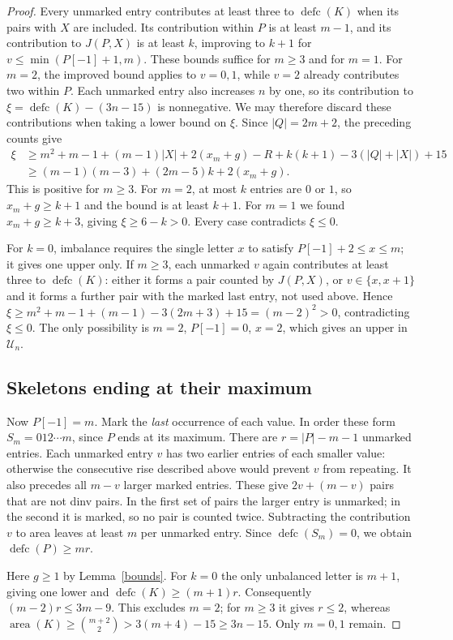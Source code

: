 \documentclass[11pt]{article}
\DeclareMathOperator{\area}{area}\DeclareMathOperator{\dinv}{dinv}
\DeclareMathOperator{\defc}{defc}\DeclareMathOperator{\sym}{sym}
\begin{document}
\begin{proof}
Every unmarked entry contributes at least three to $\defc(K)$ when its pairs with $X$ are included. Its contribution within $P$ is at least $m-1$, and its contribution to $J(P,X)$ is at least $k$, improving to $k+1$ for $v\le\min(P[-1]+1,m)$. These bounds suffice for $m\ge3$ and for $m=1$. For $m=2$, the improved bound applies to $v=0,1$, while $v=2$ already contributes two within $P$. Each unmarked entry also increases $n$ by one, so its contribution to $\xi=\defc(K)-(3n-15)$ is nonnegative. We may therefore discard these contributions when taking a lower bound on $\xi$. Since $|Q|=2m+2$, the preceding counts give
\begin{align*}
 \xi&\ge m^2+m-1+(m-1)|X|+2(x_m+g)-R+k(k+1)-3(|Q|+|X|)+15\\
 &\ge (m-1)(m-3)+(2m-5)k+2(x_m+g).
\end{align*}
This is positive for $m\ge3$. For $m=2$, at most $k$ entries are $0$ or $1$, so $x_m+g\ge k+1$ and the bound is at least $k+1$. For $m=1$ we found $x_m+g\ge k+3$, giving $\xi\ge6-k>0$. Every case contradicts $\xi\le0$.

For $k=0$, imbalance requires the single letter $x$ to satisfy $P[-1]+2\le x\le m$; it gives one upper only. If $m\ge3$, each unmarked $v$ again contributes at least three to $\defc(K)$: either it forms a pair counted by $J(P,X)$, or $v\in\{x,x+1\}$ and it forms a further pair with the marked last entry, not used above. Hence $\xi\ge m^2+m-1+(m-1)-3(2m+3)+15=(m-2)^2>0$, contradicting $\xi\le0$. The only possibility is $m=2$, $P[-1]=0$, $x=2$, which gives an upper in $\mathcal U_n$.

\subsection*{Skeletons ending at their maximum}
Now $P[-1]=m$. Mark the \emph{last} occurrence of each value. In order these form $S_m=012\cdots m$, since $P$ ends at its maximum. There are $r=|P|-m-1$ unmarked entries. Each unmarked entry $v$ has two earlier entries of each smaller value: otherwise the consecutive rise described above would prevent $v$ from repeating. It also precedes all $m-v$ larger marked entries. These give $2v+(m-v)$ pairs that are not dinv pairs. In the first set of pairs the larger entry is unmarked; in the second it is marked, so no pair is counted twice. Subtracting the contribution $v$ to area leaves at least $m$ per unmarked entry. Since $\defc(S_m)=0$, we obtain $\defc(P)\ge mr$.

Here $g\ge1$ by Lemma~\ref{bounds}. For $k=0$ the only unbalanced letter is $m+1$, giving one lower and $\defc(K)\ge(m+1)r$. Consequently $(m-2)r\le3m-9$. This excludes $m=2$; for $m\ge3$ it gives $r\le2$, whereas $\area(K)\ge\binom{m+2}2>3(m+4)-15\ge3n-15$. Only $m=0,1$ remain.


\end{proof}
\end{document}
